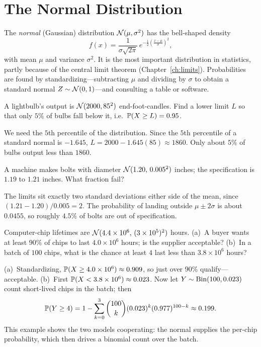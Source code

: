 \section{The Normal Distribution}

The \emph{normal} (Gaussian) distribution $\mathcal{N}(\mu,\sigma^2)$ has the
bell-shaped density
\[
  f(x)=\frac{1}{\sigma\sqrt{2\pi}}\,e^{-\frac12\left(\frac{x-\mu}{\sigma}\right)^2},
\]
with mean $\mu$ and variance $\sigma^2$. It is the most important distribution in
statistics, partly because of the central limit theorem
(Chapter~\ref{ch:limits}). Probabilities are found by standardizing—subtracting
$\mu$ and dividing by $\sigma$ to obtain a standard normal $Z\sim\mathcal{N}(0,1)$—and
consulting a table or software.

\begin{example}
A lightbulb's output is $\mathcal{N}(2000, 85^2)$ end-foot-candles. Find a lower limit
$L$ so that only $5\%$ of bulbs fall below it, i.e.\ $\mathbb{P}(X\ge L)=0.95$.

\solution We need the $5$th percentile of the distribution. Since the $5$th
percentile of a standard normal is $-1.645$, $L=2000-1.645(85)\approx 1860$. Only
about $5\%$ of bulbs output less than $1860$.
\end{example}

\begin{example}
A machine makes bolts with diameter $\mathcal{N}(1.20,\,0.005^2)$ inches; the
specification is $1.19$ to $1.21$ inches. What fraction fail?

\solution The limits sit exactly two standard deviations either side of the
mean, since $(1.21-1.20)/0.005=2$. The probability of landing outside
$\mu\pm 2\sigma$ is about $0.0455$, so roughly $4.5\%$ of bolts are out of
specification.
\end{example}

\begin{example}
Computer-chip lifetimes are $\mathcal{N}(4.4\times10^6,\,(3\times10^5)^2)$ hours.
(a)~A buyer wants at least $90\%$ of chips to last $4.0\times10^6$ hours; is the
supplier acceptable? (b)~In a batch of $100$ chips, what is the chance at least
$4$ last less than $3.8\times10^6$ hours?

\solution (a)~Standardizing, $\mathbb{P}(X\ge 4.0\times10^6)\approx 0.909$, so just
over $90\%$ qualify—acceptable. (b)~First $\mathbb{P}(X<3.8\times10^6)\approx 0.023$.
Now let $Y\sim\mathrm{Bin}(100,0.023)$ count short-lived chips in the batch; then
\[
  \mathbb{P}(Y\ge 4)=1-\sum_{k=0}^{3}\binom{100}{k}(0.023)^k(0.977)^{100-k}\approx 0.199.
\]
This example shows the two models cooperating: the normal supplies the
per-chip probability, which then drives a binomial count over the batch.
\end{example}

